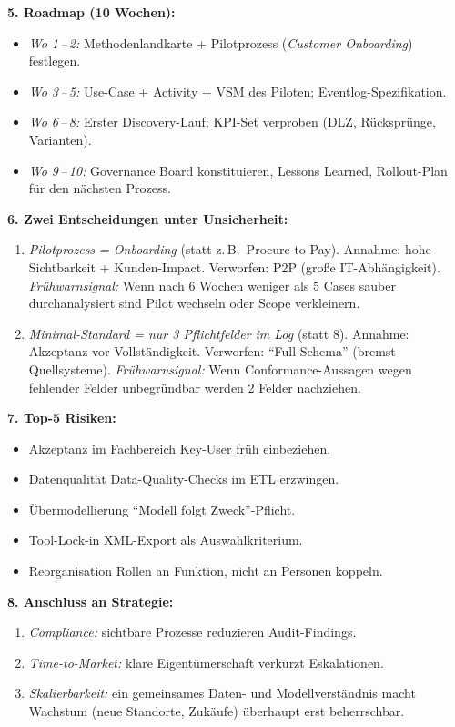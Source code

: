 \documentclass[11pt,a4paper,oneside]{article}
\begin{document}
\begin{loesungbox}
\smallskip
\textbf{5. Roadmap (10 Wochen):}
\begin{itemize}
  \item \emph{Wo 1\,--\,2:} Methodenlandkarte + Pilotprozess (\emph{Customer Onboarding}) festlegen.
  \item \emph{Wo 3\,--\,5:} Use-Case + Activity + VSM des Piloten; Eventlog-Spezifikation.
  \item \emph{Wo 6\,--\,8:} Erster Discovery-Lauf; KPI-Set verproben (DLZ, R\"uckspr\"unge, Varianten).
  \item \emph{Wo 9\,--\,10:} Governance Board konstituieren, Lessons Learned, Rollout-Plan f\"ur den n\"achsten Prozess.
\end{itemize}

\smallskip
\textbf{6. Zwei Entscheidungen unter Unsicherheit:}
\begin{enumerate}
  \item \emph{Pilotprozess = Onboarding} (statt z.\,B.\ Procure-to-Pay). Annahme: hohe Sichtbarkeit + Kunden-Impact. Verworfen: P2P (gro{\ss}e IT-Abh\"angigkeit). \emph{Fr\"uhwarnsignal:} Wenn nach 6 Wochen weniger als 5 Cases sauber durchanalysiert sind \textrightarrow{} Pilot wechseln oder Scope verkleinern.
  \item \emph{Minimal-Standard = nur 3 Pflichtfelder im Log} (statt 8). Annahme: Akzeptanz vor Vollst\"andigkeit. Verworfen: ``Full-Schema'' (bremst Quellsysteme). \emph{Fr\"uhwarnsignal:} Wenn Conformance-Aussagen wegen fehlender Felder unbegr\"undbar werden \textrightarrow{} 2 Felder nachziehen.
\end{enumerate}

\smallskip
\textbf{7. Top-5 Risiken:}
\begin{itemize}
  \item Akzeptanz im Fachbereich \textrightarrow{} Key-User fr\"uh einbeziehen.
  \item Datenqualit\"at \textrightarrow{} Data-Quality-Checks im ETL erzwingen.
  \item \"Ubermodellierung \textrightarrow{} ``Modell folgt Zweck''-Pflicht.
  \item Tool-Lock-in \textrightarrow{} XML-Export als Auswahl\-kriterium.
  \item Reorganisation \textrightarrow{} Rollen an Funktion, nicht an Personen koppeln.
\end{itemize}

\smallskip
\textbf{8. Anschluss an Strategie:}
\begin{enumerate}
  \item \emph{Compliance:} sichtbare Prozesse reduzieren Audit-Findings.
  \item \emph{Time-to-Market:} klare Eigent\"umerschaft verk\"urzt Eskalationen.
  \item \emph{Skalierbarkeit:} ein gemeinsames Daten- und Modellverst\"andnis macht Wachstum (neue Standorte, Zuk\"aufe) \"uberhaupt erst beherrschbar.
\end{enumerate}
\end{loesungbox}
\end{document}
